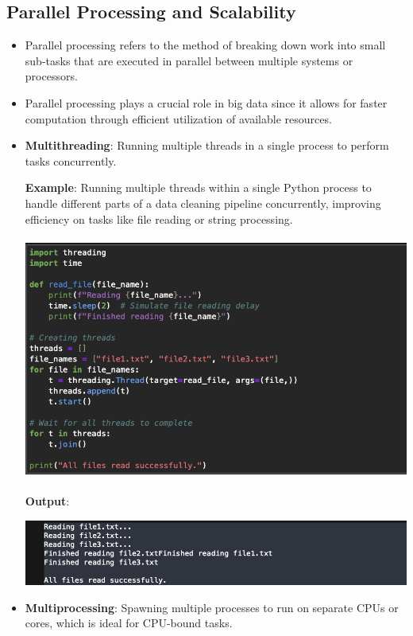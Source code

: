 \documentclass{article}
\begin{document}
\subsection{Parallel Processing and Scalability}
\begin{itemize}
\item Parallel processing refers to the method of breaking down work into small sub-tasks that are executed in parallel between multiple systems or processors.
\item Parallel processing plays a crucial role in big data since it allows for faster computation through efficient utilization of available resources.
\item \textbf{Multithreading}: Running multiple threads in a single process to perform tasks concurrently.

\textbf{Example}: Running multiple threads within a single Python process to handle different parts of a data cleaning pipeline concurrently, improving efficiency on tasks like file reading or string processing.

\includegraphics[width=14cm,height=8cm]{Multithreading.png}

\textbf{Output}:

\includegraphics[width=14cm,height=3
cm]{Multithreading_Output.png}
\newpage
\item \textbf{Multiprocessing}: Spawning multiple processes to run on separate CPUs or cores, which is ideal for CPU-bound tasks.


\end{itemize}
\end{document}
